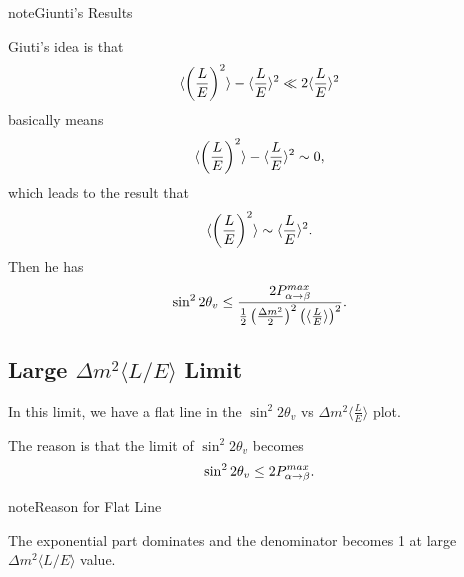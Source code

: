\documentclass[letterpaper,12pt,english]{sphinxmanual}
\begin{document}
\begin{notice}{note}{Giunti's Results}

Giuti's idea is that
\begin{gather}
\begin{split}\langle \left(\frac{L}{E} \right)^2 \rangle - \langle \frac{L}{E}\rangle^2 \ll 2\langle \frac{L}{E}\rangle^2\end{split}\notag
\end{gather}
basically means
\begin{gather}
\begin{split}\langle \left(\frac{L}{E} \right)^2 \rangle - \langle \frac{L}{E}\rangle^2 \sim 0,\end{split}\notag
\end{gather}
which leads to the result that
\begin{gather}
\begin{split}\langle \left(\frac{L}{E} \right)^2 \rangle \sim \langle \frac{L}{E}\rangle^2.\end{split}\notag
\end{gather}
Then he has
\begin{gather}
\begin{split}\sin^2 2\theta_v \leq \frac{2 P_{\alpha\to\beta}^{max} }{ \frac{1}{2} \left( \frac{\Delta m^2}{2} \right)^2  \left(\langle\frac{L}{E} \rangle\right)^2 }.\end{split}\notag
\end{gather}\end{notice}


\subsection{Large \(\Delta m^2 \langle L/E \rangle\) Limit}
\label{experiments:large-limit}
In this limit, we have a flat line in the \(\sin^2 2\theta_v\) vs \(\Delta m^2 \langle\frac{L}{E}\rangle\) plot.

The reason is that the limit of \(\sin^2 2\theta_v\) becomes
\begin{gather}
\begin{split}\sin^2 2\theta_v \leq 2  P_{\alpha\to\beta}^{max}.\end{split}\notag
\end{gather}
\begin{notice}{note}{Reason for Flat Line}

The exponential part dominates and the denominator becomes 1 at large \(\Delta m^2 \langle L/E \rangle\) value.
\end{notice}
\end{document}
